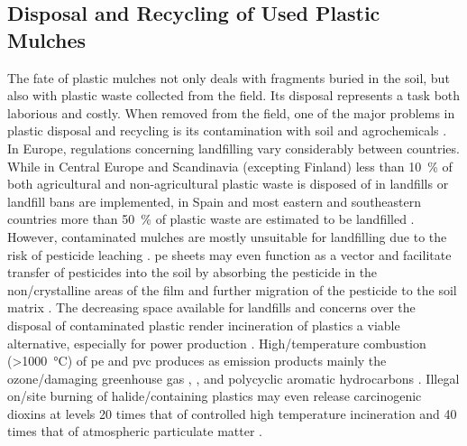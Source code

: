 \subsection{Disposal and Recycling of Used Plastic Mulches}
\label{sec:plastic-mulching:recycling}

The fate of plastic mulches not only deals with fragments buried in the soil, but also with plastic waste collected from the field. Its disposal represents a task both laborious and costly. When removed from the field, one of the major problems in plastic disposal and recycling is its contamination with soil and agrochemicals \citep{Gonzalez-SanchezUse2014,Scarascia-MugnozzaPlastic2011}.
In Europe, regulations concerning landfilling vary considerably between countries. While in Central Europe and Scandinavia (excepting Finland) less than \SI{10}{\percent} of both agricultural and non-agricultural plastic waste is disposed of in landfills or landfill bans are implemented, in Spain and most eastern and southeastern countries more than \SI{50}{\percent} of plastic waste are estimated to be landfilled \citep{PlasticsEuropePlastics2015}. However, contaminated mulches are mostly unsuitable for landfilling due to the risk of pesticide leaching \citep{GartheManaging2004,WangSoil2013}. \ac{pe} sheets may even function as a vector and facilitate transfer of pesticides into the soil by absorbing the pesticide in the non\-/crystalline areas of the film \citep{HuckinsLipidcontaining1993,NerinAbsorption1996} and further migration of the pesticide to the soil matrix \citep{RamosPolyethylene2015}. The decreasing space available for landfills and concerns over the disposal of contaminated plastic render incineration of plastics a viable alternative, especially for power production \citep{GartheManaging2004}. High\-/temperature combustion (\SI{>1000}{\degreeCelsius}) of \ac{pe} and \ac{pvc} produces as emission products mainly the ozone\-/damaging greenhouse gas , , and polycyclic aromatic hydrocarbons \citep{WangComparative2003}. Illegal on\-/site burning of halide\-/containing plastics may even release carcinogenic dioxins at levels 20 times that of controlled high temperature incineration and 40 times that of atmospheric particulate matter \citep{LevitanRecycling2003}.

